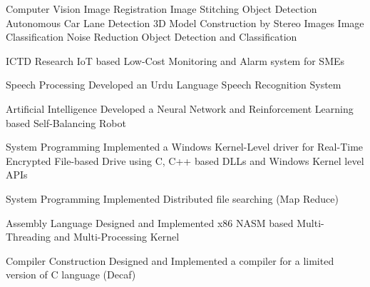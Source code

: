 

\begin{cvprojects}

  \cvproject
    {Computer Vision} %
    {Image Registration \acvSep Image Stitching \acvSep Object Detection \acvSep Autonomous Car Lane Detection \acvSep 3D Model Construction by Stereo Images \acvSep Image Classification \acvSep Noise Reduction \acvSep Object Detection and Classification} %

  \cvproject
    {ICTD Research} %
    {IoT based Low-Cost Monitoring and Alarm system for SMEs} %

  \cvproject
    {Speech Processing} %
    {Developed an Urdu Language Speech Recognition System} %

  \cvproject
    {Artificial Intelligence} %
    {Developed a Neural Network and Reinforcement Learning based Self-Balancing Robot} %

  \cvproject
    {System Programming} %
    {Implemented a Windows Kernel-Level driver for Real-Time Encrypted File-based Drive using C, C++ based DLLs and Windows Kernel level APIs} %

  \cvproject
    {System Programming} %
    {Implemented Distributed file searching (Map Reduce)} %

  \cvproject
    {Assembly Language} %
    {Designed and Implemented x86 NASM based Multi-Threading and Multi-Processing Kernel} %

  \cvproject
    {Compiler Construction} %
    {Designed and Implemented a compiler for a limited version of C language (Decaf)} %


\end{cvprojects}
